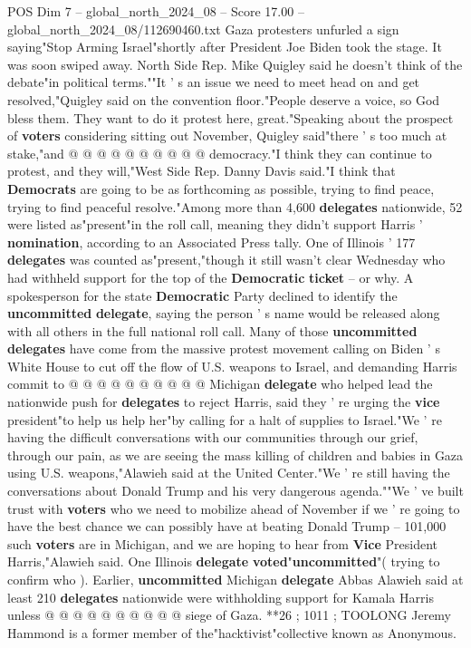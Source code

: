 \begin{textsample}{POS Dim 7 – global\_north\_2024\_08 – Score 17.00 – global\_north\_2024\_08/112690460.txt}
Gaza protesters unfurled a sign saying"Stop Arming Israel"shortly after President Joe Biden took the stage.
It was soon swiped away.
North Side Rep.
Mike Quigley said he doesn't think of the debate"in political terms.""It ' s an issue we need to meet head on and get resolved,"Quigley said on the convention floor."People deserve a voice, so God bless them.
They want to do it protest here, great."Speaking about the prospect of \textbf{voters} considering sitting out November, Quigley said"there ' s too much at stake,"and @ @ @ @ @ @ @ @ @ @ democracy."I think they can continue to protest, and they will,"West Side Rep.
Danny Davis said."I think that \textbf{Democrats} are going to be as forthcoming as possible, trying to find peace, trying to find peaceful resolve."Among more than 4,600 \textbf{delegates} nationwide, 52 were listed as"present"in the roll call, meaning they didn't support Harris ' \textbf{nomination}, according to an Associated Press tally.
One of Illinois ' 177 \textbf{delegates} was counted as"present,"though it still wasn't clear Wednesday who had withheld support for the top of the \textbf{Democratic} \textbf{ticket} -- or why.
A spokesperson for the state \textbf{Democratic} Party declined to identify the \textbf{uncommitted} \textbf{delegate}, saying the person ' s name would be released along with all others in the full national roll call.
Many of those \textbf{uncommitted} \textbf{delegates} have come from the massive protest movement calling on Biden ' s White House to cut off the flow of U.S. weapons to Israel, and demanding Harris commit to @ @ @ @ @ @ @ @ @ @ Michigan \textbf{delegate} who helped lead the nationwide push for \textbf{delegates} to reject Harris, said they ' re urging the \textbf{vice} president"to help us help her"by calling for a halt of supplies to Israel."We ' re having the difficult conversations with our communities through our grief, through our pain, as we are seeing the mass killing of children and babies in Gaza using U.S. weapons,"Alawieh said at the United Center."We ' re still having the conversations about Donald Trump and his very dangerous agenda.""We ' ve built trust with \textbf{voters} who we need to mobilize ahead of November if we ' re going to have the best chance we can possibly have at beating Donald Trump -- 101,000 such \textbf{voters} are in Michigan, and we are hoping to hear from \textbf{Vice} President Harris,"Alawieh said.
One Illinois \textbf{delegate} \textbf{voted}"\textbf{uncommitted}"( trying to confirm who ).
Earlier, \textbf{uncommitted} Michigan \textbf{delegate} Abbas Alawieh said at least 210 \textbf{delegates} nationwide were withholding support for Kamala Harris unless @ @ @ @ @ @ @ @ @ @ siege of Gaza. **26 ; 1011 ; TOOLONG Jeremy Hammond is a former member of the"hacktivist"collective known as Anonymous.

\end{textsample}
